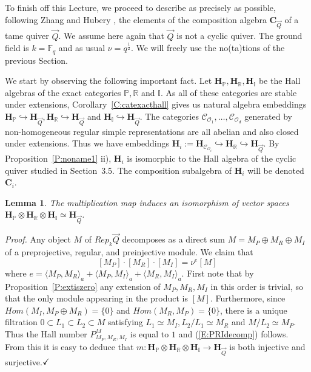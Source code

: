 \documentclass[a4paper,10pt]{amsart}
\def\H{\mathbf{H}}
\def\qed{$\hfill \checkmark$}
\newtheorem{lem}[theo]{Lemma}
\numberwithin{equation}{section}
\begin{document}
\vspace{.15in}

To finish off this Lecture, we proceed to describe as precisely as possible, following Zhang \cite{Zhang} and Hubery \cite{Hubery}, the elements of the composition algebra $\mathbf{C}_{\vec{Q}}$ of a tame quiver $\vec{Q}$. We assume here again that $\vec{Q}$ is not a cyclic quiver. The ground field is $k=\mathbb{F}_q$ and as usual $\nu=q^{\frac{1}{2}}$. We will freely use the no(ta)tions of the previous Section.

\vspace{.15in}

We start by observing the following important fact. Let $\H_{\mathbb{P}}, \H_{\mathbb{R}}, \H_{\mathbb{I}}$ be the Hall algebras of the exact categories $\mathbb{P},\mathbb{R}$ and $\mathbb{I}$. As all of these categories are stable under extensions, Corollary~\ref{C:catexacthall} gives us natural algebra embeddings $\H_{\mathbb{P}} \hookrightarrow \H_{\vec{Q}}, \H_{\mathbb{R}} \hookrightarrow \H_{\vec{Q}}$ and $\H_{\mathbb{I}} \hookrightarrow \H_{\vec{Q}}$. The categories
$\mathcal{C}_{\mathcal{O}_1}, \ldots, \mathcal{C}_{\mathcal{O}_d}$ generated by non-homogeneous regular simple representations are all abelian and also closed under extensions. Thus we have embeddings $\H_i:=\H_{\mathcal{C}_{\mathcal{O}_i}} \hookrightarrow \H_{\mathbb{R}} \hookrightarrow \H_{\vec{Q}}$. By Proposition~\ref{P:noname1} ii), $\H_i$ is isomorphic to the Hall algebra of the cyclic quiver studied in Section~3.5. The composition subalgebra of $\H_i$ will be denoted $\mathbf{C}_i $.

\vspace{.15in}

\begin{lem} The multiplication map induces an isomorphism of vector spaces $\H_{\mathbb{P}} \otimes \H_{\mathbb{R}} \otimes \mathbf{H}_{\mathbb{I}} \simeq \H_{\vec{Q}}$.
\end{lem}

\noindent
\textit{Proof.} Any object $M$ of $Rep_k\vec{Q}$ decomposes as a direct sum $M=M_P \oplus M_R \oplus M_I$ of a preprojective, regular, and preinjective module. We claim that
\begin{equation}\label{E:PRIdecomp}
[M_P]\cdot [M_R]\cdot [M_I]=\nu^e[M]
\end{equation}
where $e=\langle M_P,M_R\rangle_a + \langle M_P,M_I\rangle_a + \langle M_R,M_I\rangle_a$. First note that by Proposition~\ref{P:extiszero} any extension of $M_P,M_R,M_I$ in this order is trivial, so that the only module appearing in the product is $[M]$. Furthermore, since ${Hom}(M_I, M_P \oplus M_R)=\{0\}$ and ${Hom}(M_R,M_P)=\{0\}$, there is a unique filtration $0 \subset L_1 \subset L_2 \subset M$ satisfying $L_1 \simeq M_I, L_2/L_1 \simeq M_R$ and $M/L_2 \simeq M_P$. Thus the Hall number $P_{M_P,M_R,M_I}^M$ is equal to $1$ and (\ref{E:PRIdecomp}) follows. From this it is easy to deduce that $m: \H_{\mathbb{P}} \otimes \H_{\mathbb{R}} \otimes \H_{\mathbb{I}} \to \H_{\vec{Q}}$ is both injective and surjective.\qed
\end{document}
